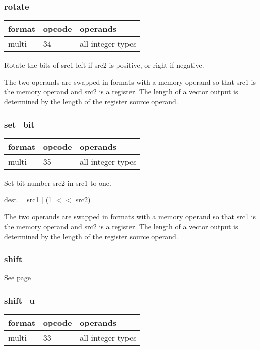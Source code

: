 \documentclass[forwardcom.tex]{subfiles}
\begin{document}
\subsubsection{rotate}
\label{table:rotateInstruction}
\begin{tabular}{|p{12mm}|p{12mm}|p{110mm}|}
\hline
\bfseries format & \bfseries opcode & \bfseries operands \\ \hline
multi & 34 & all integer types \\ \hline
\end{tabular}
\vspace{2mm}

Rotate the bits of src1 left if src2 is positive, or right if negative.

\vspace{2mm}
The two operands are swapped in formats with a memory operand so that src1 is the memory operand and src2 is a register. The length of a vector output is determined by the length of the register source operand.

\subsubsection{set\_bit}
\label{table:setBitInstruction}
\begin{tabular}{|p{12mm}|p{12mm}|p{110mm}|}
\hline
\bfseries format & \bfseries opcode & \bfseries operands \\ \hline
multi & 35 & all integer types \\ \hline
\end{tabular}
\vspace{2mm}

Set bit number src2 in src1 to one.
\vspace{2mm}

dest = src1 $|$ (1 $<<$ src2)

\vspace{2mm}
The two operands are swapped in formats with a memory operand so that src1 is the memory operand and src2 is a register. The length of a vector output is determined by the length of the register source operand.

\subsubsection{shift}
See page \pageref{table:shiftInstruction}

\subsubsection{shift\_u}
\label{table:shiftUInstruction}
\begin{tabular}{|p{12mm}|p{12mm}|p{110mm}|}
\hline
\bfseries format & \bfseries opcode & \bfseries operands \\ \hline
multi & 33 & all integer types \\ \hline
\end{tabular}
\vspace{2mm}
\end{document}

